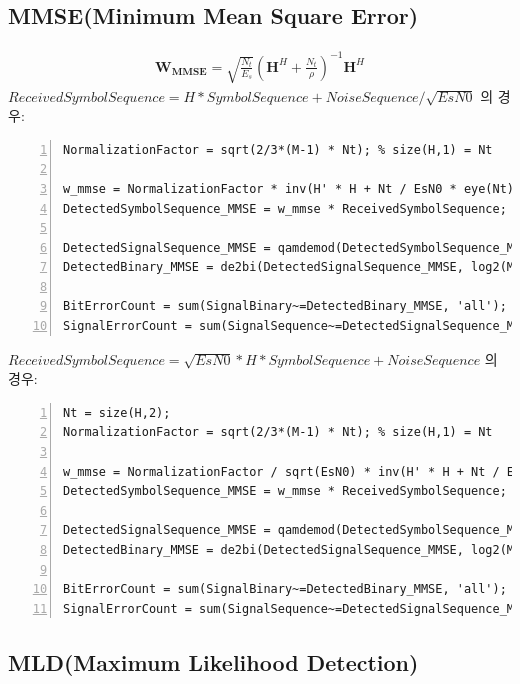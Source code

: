 \documentclass{article}
\begin{document}
\subsection{MMSE(Minimum Mean Square Error)}
\begin{gather}
	\boldsymbol{W_{MMSE}}=\sqrt{\frac{N_t}{E_s}}(\boldsymbol{H}^H+\frac{N_t}{\rho})^{-1}\boldsymbol{H}^H
\end{gather}
$ReceivedSymbolSequence = H * SymbolSequence + NoiseSequence / \sqrt{EsN0}$ 의 경우:
\begin{lstlisting}[style=Matlab-editor, frame=single, numbers=left,]
NormalizationFactor = sqrt(2/3*(M-1) * Nt); % size(H,1) = Nt

w_mmse = NormalizationFactor * inv(H' * H + Nt / EsN0 * eye(Nt)) * H';
DetectedSymbolSequence_MMSE = w_mmse * ReceivedSymbolSequence;

DetectedSignalSequence_MMSE = qamdemod(DetectedSymbolSequence_MMSE, M);
DetectedBinary_MMSE = de2bi(DetectedSignalSequence_MMSE, log2(M), 'left-msb');

BitErrorCount = sum(SignalBinary~=DetectedBinary_MMSE, 'all');
SignalErrorCount = sum(SignalSequence~=DetectedSignalSequence_MMSE, 'all');
\end{lstlisting}
\vspace{0.5cm}
$ReceivedSymbolSequence = \sqrt{EsN0} * H * SymbolSequence + NoiseSequence$ 의 경우:
\begin{lstlisting}[style=Matlab-editor, frame=single, numbers=left,]
Nt = size(H,2);
NormalizationFactor = sqrt(2/3*(M-1) * Nt); % size(H,1) = Nt

w_mmse = NormalizationFactor / sqrt(EsN0) * inv(H' * H + Nt / EsN0 * eye(Nt)) * H';
DetectedSymbolSequence_MMSE = w_mmse * ReceivedSymbolSequence; % Detection (Zero-Forcing: y / h)

DetectedSignalSequence_MMSE = qamdemod(DetectedSymbolSequence_MMSE, M); % Detection
DetectedBinary_MMSE = de2bi(DetectedSignalSequence_MMSE, log2(M), 'left-msb');

BitErrorCount = sum(SignalBinary~=DetectedBinary_MMSE, 'all');
SignalErrorCount = sum(SignalSequence~=DetectedSignalSequence_MMSE, 'all');
\end{lstlisting}
\subsection{MLD(Maximum Likelihood Detection)}
\end{document}
